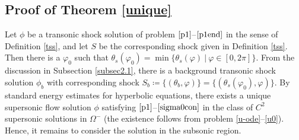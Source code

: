 \documentclass[reqno,12pt]{amsart}
\numberwithin{equation}{section}
\begin{document}
\subsection{Proof of Theorem \ref{unique}}\label{subsec2.2}
Let $\phi$ be a transonic shock solution of problem $\eqref{p1}$--$\eqref{p1end}$ in the sense of Definition \ref{tss}, and let $S$ be the corresponding shock given in Definition \ref{tss}. Then there is a  $\varphi_0$ such that $\theta_s(\varphi_0)=\min\{\theta_s(\varphi)~|~\varphi\in[0,2\pi]\}$. From the discussion in Subsection \ref{subsec2.1}, there is a  background transonic shock solution $\phi_b$ with corresponding shock $S_b\coloneqq\{(\theta_{b},\varphi)\}=\{(\theta_{s}(\varphi_0),\varphi)\}$. By standard energy estimates  for hyperbolic equations, there exists a unique supersonic flow solution $\phi$ satisfying $\eqref{p1}$--$\eqref{sigma0con}$ in the class of $C^2$ supersonic solutions in $\Omega^-$ (the existence follows from problem \eqref{u-ode}--\eqref{u0}). Hence, it remains to consider the solution in the subsonic region.
\end{document}
